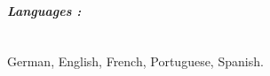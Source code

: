 \documentclass[10pt,letterpaper]{report}
\begin{document}
\paragraph{\it \bf Languages :}
\ \\
German, English, French, Portuguese, Spanish. 




 
\end{document}
